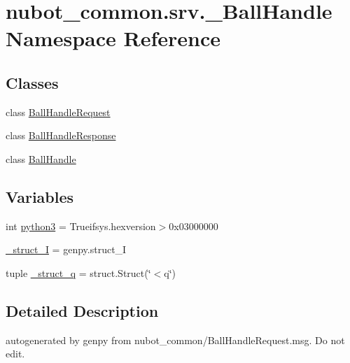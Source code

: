 \hypertarget{namespacenubot__common_1_1srv_1_1__BallHandle}{\section{nubot\-\_\-common.\-srv.\-\_\-\-Ball\-Handle Namespace Reference}
\label{namespacenubot__common_1_1srv_1_1__BallHandle}
}
\subsection*{Classes}
\begin{DoxyCompactItemize}
\item 
class \hyperlink{classnubot__common_1_1srv_1_1__BallHandle_1_1BallHandleRequest}{Ball\-Handle\-Request}
\item 
class \hyperlink{classnubot__common_1_1srv_1_1__BallHandle_1_1BallHandleResponse}{Ball\-Handle\-Response}
\item 
class \hyperlink{classnubot__common_1_1srv_1_1__BallHandle_1_1BallHandle}{Ball\-Handle}
\end{DoxyCompactItemize}
\subsection*{Variables}
\begin{DoxyCompactItemize}
\item 
int \hyperlink{namespacenubot__common_1_1srv_1_1__BallHandle_a5b43d243eb270a053a02014aebbe0b57}{python3} = Trueifsys.\-hexversion$>$0x03000000
\item 
\hyperlink{namespacenubot__common_1_1srv_1_1__BallHandle_ab2af3865598445d74f9f6f9dd829fbab}{\-\_\-struct\-\_\-\-I} = genpy.\-struct\-\_\-\-I
\item 
tuple \hyperlink{namespacenubot__common_1_1srv_1_1__BallHandle_a0a6e3fbd722e66ea563734cefc28ef12}{\-\_\-struct\-\_\-q} = struct.\-Struct(\char`\"{}$<$q\char`\"{})
\end{DoxyCompactItemize}


\subsection{Detailed Description}
\begin{DoxyVerb}autogenerated by genpy from nubot_common/BallHandleRequest.msg. Do not edit.\end{DoxyVerb}
 

